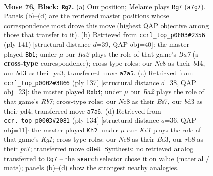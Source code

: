 \documentclass[11pt]{article}
\begin{document}
\clearpage

\begin{figure}[p]\centering
\begin{subfigure}{0.46\textwidth}\centering
\resizebox{\linewidth}{!}{%
\newchessgame
\chessboard[
  setfen={1Rnk4/r7/P7/2P4p/8/2pB1KPP/2P5/8 b - - 2 76},
  showmover=false,
  pgfstyle=straightmove, color=movearrow, markmove={a7-g7}
]}
\caption{}
\end{subfigure}\hfill
\begin{subfigure}{0.46\textwidth}\centering
\resizebox{\linewidth}{!}{%
\newchessgame
\chessboard[
  setfen={8/5k2/7p/3r3P/p2B1P1K/P7/bP1R4/8 b - - 0 71},
  showmover=false,
  pgfstyle=straightmove, color=movearrow, markmove={a2-b1}
]}
\caption{}
\end{subfigure}
\\[4pt]
\begin{subfigure}{0.46\textwidth}\centering
\resizebox{\linewidth}{!}{%
\newchessgame
\chessboard[
  setfen={8/1R2bk2/8/1P3p2/3PpP1p/1P2P3/1r6/6BK b - - 0 69},
  showmover=false,
  pgfstyle=straightmove, color=movearrow, markmove={b2-b3}
]}
\caption{}
\end{subfigure}\hfill
\begin{subfigure}{0.46\textwidth}\centering
\resizebox{\linewidth}{!}{%
\newchessgame
\chessboard[
  setfen={4r3/2p2k2/3p4/3Pb3/1pR2p2/3B3p/5P2/6K1 w - - 2 68},
  showmover=false,
  pgfstyle=straightmove, color=movearrow, markmove={g1-h2}
]}
\caption{}
\end{subfigure}
\caption{\textbf{Move 76, Black: \texttt{Rg7}.} (a) Our position; Melanie plays \texttt{Rg7} (\texttt{a7g7}). Panels (b)--(d) are the retrieved master positions whose correspondence most drove this move (highest QAP objective among those that transfer to it). (b) Retrieved from \texttt{ccrl\_top\_p0003\#2356} (ply 141) [structural distance $d$=39, QAP obj=40]: the master played \texttt{Bb1}; under $\mu$ our \emph{Ra2} plays the role of that game's \emph{Ba7} (a \textbf{cross-type} correspondence); cross-type roles: our \emph{N}c8 as their \emph{b}d4, our \emph{b}d3 as their \emph{p}a3; transferred move \texttt{a7a6}. (c) Retrieved from \texttt{ccrl\_top\_p0002\#3866} (ply 137) [structural distance $d$=38, QAP obj=23]: the master played \texttt{Rxb3}; under $\mu$ our \emph{Ra2} plays the role of that game's \emph{Rb7}; cross-type roles: our \emph{N}c8 as their \emph{B}e7, our \emph{b}d3 as their \emph{p}d4; transferred move \texttt{a7a6}. (d) Retrieved from \texttt{ccrl\_top\_p0003\#2081} (ply 134) [structural distance $d$=36, QAP obj=11]: the master played \texttt{Kh2}; under $\mu$ our \emph{Kd1} plays the role of that game's \emph{Kg1}; cross-type roles: our \emph{N}c8 as their \emph{B}d3, our \emph{r}b8 as their \emph{p}c7; transferred move \texttt{d8e8}. Synthesis: no retrieved analog transferred to \texttt{Rg7} -- the \texttt{search} selector chose it on value (material / mate); panels (b)--(d) show the strongest nearby analogies.}
\label{fig:thought-m151}
\end{figure}
\end{document}
